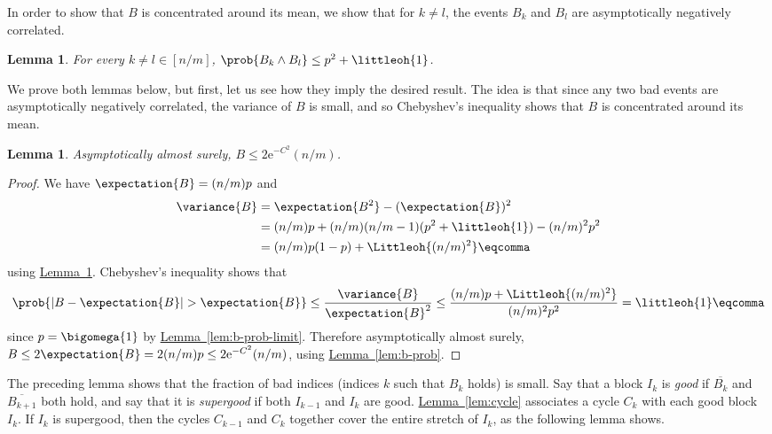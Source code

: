 \documentclass[11pt]{article}
\numberwithin{equation}{section}
\newtheorem{lemma}[theorem]{Lemma}
\theoremstyle{definition}
\theoremstyle{plain}
\newcommand{\eee}{\mathrm e}
\newcommand{\expref}[2]{\hyperref[#2]{#1~\ref{#2}}}
\begin{document}
In order to show that $B$ is concentrated around its mean, we show that for $k \neq l$, the events $B_k$ and $B_l$ are asymptotically negatively correlated.

\begin{lemma} \label{lem:correlation}
 For every $k \neq l \in [n/m]$, $\prob{B_k \land B_l} \leq p^2 + \littleoh{1}$.
\end{lemma}

We prove both lemmas below, but first, let us see how they imply the desired result. The idea is that since any two bad events are asymptotically negatively correlated, the variance of $B$ is small, and so Chebyshev's inequality shows that $B$ is concentrated around its mean.

\begin{lemma} \label{lem:concentration}
 Asymptotically almost surely, $B \leq 2\eee^{-C^2} (n/m)$.
\end{lemma}
\begin{proof}
 We have $\expectation{B} = (n/m)p$ and
\begin{align*}
 \variance{B} &= \expectation{B^2} - (\expectation{B})^2 \\ &=
 (n/m)p + (n/m)(n/m-1)(p^2 + \littleoh{1}) - (n/m)^2p^2 \\ &=
 (n/m)p(1-p) + \Littleoh{(n/m)^2} \eqcomma
\end{align*}
 using \expref{Lemma}{lem:correlation}. Chebyshev's inequality shows that
\begin{equation}
 \prob{|B-\expectation{B}|>\expectation{B}} \leq \frac{\variance{B}}{\expectation{B}^2} \leq \frac{(n/m)p + \Littleoh{(n/m)^2}}{(n/m)^2p^2} = \littleoh{1} \eqcomma
\end{equation}
 since $p = \bigomega{1}$ by \expref{Lemma}{lem:b-prob-limit}.
 Therefore asymptotically almost surely, $B \leq 2\expectation{B} = 2(n/m)p \leq 2\eee^{-C^2} (n/m)$, using \expref{Lemma}{lem:b-prob}.
\end{proof}

The preceding lemma shows that the fraction of bad indices (indices $k$ such that $B_k$ holds) is small. Say that a block $I_k$ is \emph{good} if $\overline{B_k}$ and $\overline{B_{k+1}}$ both hold, and say that it is \emph{supergood} if both $I_{k-1}$ and $I_k$ are good. \expref{Lemma}{lem:cycle} associates a cycle $C_k$ with each good block $I_k$. If $I_k$ is supergood, then the cycles $C_{k-1}$ and $C_k$ together cover the entire stretch of $I_k$, as the following lemma shows.
\end{document}
